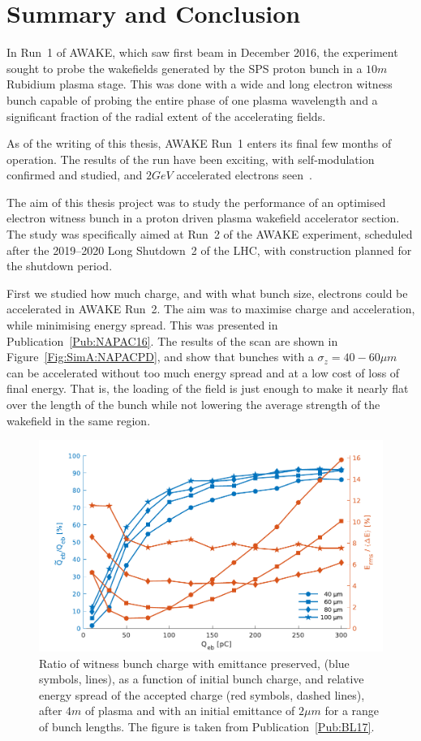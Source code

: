%
%

\chapter{Summary and Conclusion}
\label{Ch:SnC}

In Run~1 of AWAKE, which saw first beam in December 2016, the experiment sought to probe the wakefields generated by the SPS proton bunch in a $10\unit{m}$ Rubidium plasma stage.
This was done with a wide and long electron witness bunch capable of probing the entire phase of one plasma wavelength and a significant fraction of the radial extent of the accelerating fields.

As of the writing of this thesis, AWAKE Run~1 enters its final few months of operation.
The results of the run have been exciting, with self-modulation confirmed and studied, and $2\unit{GeV}$ accelerated electrons seen~\cite{adli:2018}.

The aim of this thesis project was to study the performance of an optimised electron witness bunch in a proton driven plasma wakefield accelerator section.
The study was specifically aimed at Run~2 of the AWAKE experiment, scheduled after the 2019--2020 Long Shutdown~2 of the LHC, with construction planned for the shutdown period.

First we studied how much charge, and with what bunch size, electrons could be accelerated in AWAKE Run~2.
The aim was to maximise charge and acceleration, while minimising energy spread.
This was presented in Publication~\ref{Pub:NAPAC16}.
The results of the scan are shown in Figure~\ref{Fig:SimA:NAPACPD}, and show that bunches with a $\sigma_z = 40-60\unit{\mu m}$ can be accelerated without too much energy spread and at a low cost of loss of final energy.
That is, the loading of the field is just enough to make it nearly flat over the length of the bunch while not lowering the average strength of the wakefield in the same region.

\begin{figure}[hbt]
    \centering
    \includegraphics[width=0.8125\linewidth]{figures/BeamQuality}
    \caption{\label{Fig:Sum:BQ}
        Ratio of witness bunch charge with emittance preserved, (blue symbols, lines), as a function of initial bunch charge, and relative energy spread of the accepted charge (red symbols, dashed lines), after $4\unit{m}$ of plasma and with an initial emittance of $2\unit{\mu m}$ for a range of bunch lengths.
        The figure is taken from Publication~\ref{Pub:BL17}.
    }
\end{figure}

